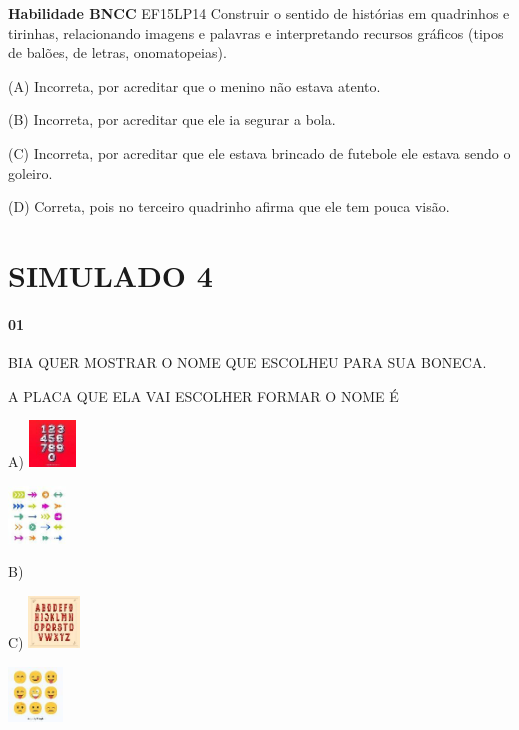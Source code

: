 \begin{escola}
\textbf{Habilidade BNCC} EF15LP14 Construir o sentido de histórias em
quadrinhos e tirinhas, relacionando imagens e palavras e interpretando
recursos gráficos (tipos de balões, de letras, onomatopeias).

(A) Incorreta, por acreditar que o menino não estava atento.

(B) Incorreta, por acreditar que ele ia segurar a bola.

(C) Incorreta, por acreditar que ele estava brincado de futebole ele
estava sendo o goleiro.

(D) Correta, pois no terceiro quadrinho afirma que ele tem pouca visão.

\chapter{SIMULADO 4}

\subsubsection{01}\label{section-73}

BIA QUER MOSTRAR O NOME QUE ESCOLHEU PARA SUA BONECA.

A PLACA QUE ELA VAI ESCOLHER FORMAR O NOME É

A)
\includegraphics[width=0.48889in,height=0.48889in]{media/image239.jpg}

\includegraphics[width=0.60625in,height=0.60625in]{media/image240.jpg}

B)

C)
\includegraphics[width=0.54236in,height=0.54236in]{media/image241.jpg}

\includegraphics[width=0.57431in,height=0.57431in]{media/image242.jpg}


\end{escola}

